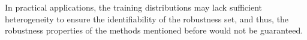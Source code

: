 In practical applications, the training distributions may lack sufficient heterogeneity to ensure the identifiability of the robustness set, and thus, the robustness properties of the methods mentioned before would not be guaranteed.
